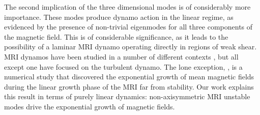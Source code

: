 \documentclass[aps,prl,reprint,superscriptaddress]{revtex4-1}
\begin{document}
The second implication of the three dimensional modes is of considerably more importance.
These modes produce dynamo action in the linear regime, as evidenced by the presence of non-trivial eigenmodes for all three components of the magnetic field.
This is of considerable significance, as it leads to the possibility of a laminar MRI dynamo operating directly in regions of weak shear.
MRI dynamos have been studied in a number of different contexts \citep{2007PhRvL..98y4502R,2011ApJ...740...18O,2015PhRvL.114h5002S}, but all except one have focused on the turbulent dynamo. The lone exception, \citet{2016MNRAS.462..818B}, is a numerical study that discovered the exponential growth of mean magnetic fields during the linear growth phase of the MRI far from stability.
Our work explains this result in terms of purely linear dynamics:
non-axisymmetric MRI unstable modes drive the exponential growth of magnetic fields.



%

\end{document}
